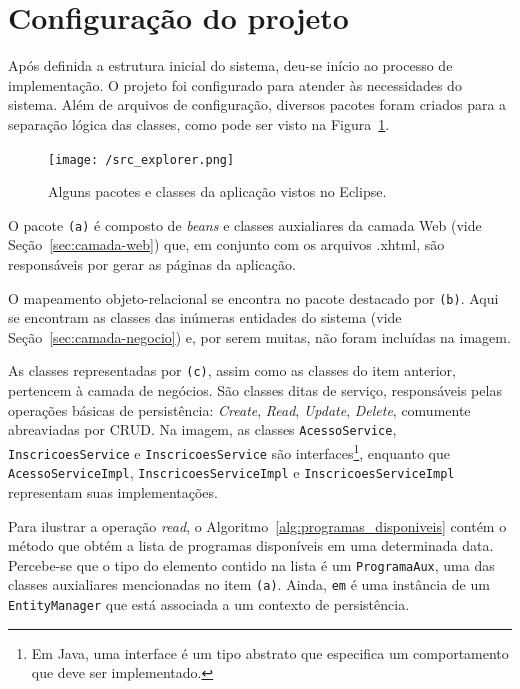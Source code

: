 \documentclass[
  10.5pt,				  %
	openright,			%
	twoside,			  %
  a5paper,
  chapter=TITLE,	%
	section=TITLE,	%
  hyphens,        %
	english,        %
	brazil          %
]{abntex2}
\begin{document}
\section{Configuração do projeto}\label{sec:config}

Após definida a estrutura inicial do sistema, deu-se início ao processo de implementação. O projeto foi configurado para atender às necessidades do sistema. Além de arquivos de configuração, diversos pacotes foram criados para a separação lógica das classes, como pode ser visto na Figura~\ref{fig:src_explorer}.

\begin{figure}[!ht]
  \caption{\label{fig:src_explorer} Alguns pacotes e classes da aplicação vistos no Eclipse. }
  \begin{center}
    \texttt{[image: /src\_explorer.png]}
  \end{center}
\end{figure}

O pacote \texttt{(a)} é composto de \emph{beans} e classes auxialiares da camada Web (vide Seção~\ref{sec:camada-web}) que, em conjunto com os arquivos .xhtml, são responsáveis por gerar as páginas da aplicação.

O mapeamento objeto-relacional se encontra no pacote destacado por \texttt{(b)}. Aqui se encontram as classes das inúmeras entidades do sistema (vide Seção~\ref{sec:camada-negocio}) e, por serem muitas, não foram incluídas na imagem.

As classes representadas por \texttt{(c)}, assim como as classes do item anterior, pertencem à camada de negócios. São classes ditas de serviço, responsáveis pelas operações básicas de persistência: \emph{Create}, \emph{Read}, \emph{Update}, \emph{Delete}, comumente abreaviadas por CRUD. Na imagem, as classes \texttt{AcessoService}, \texttt{InscricoesService} e \texttt{InscricoesService} são interfaces\footnote{Em Java, uma interface é um tipo abstrato que especifica um comportamento que deve ser implementado.}, enquanto que \texttt{AcessoServiceImpl}, \texttt{InscricoesServiceImpl} e \texttt{InscricoesServiceImpl} representam suas implementações.



Para ilustrar a operação \emph{read}, o Algoritmo~\ref{alg:programas_disponiveis} contém o método que obtém a lista de programas disponíveis em uma determinada data. Percebe-se que o tipo do elemento contido na lista é um \texttt{ProgramaAux}, uma das classes auxialiares mencionadas no item \texttt{(a)}. Ainda, \texttt{em} é uma instância de um \texttt{EntityManager} que está associada a um contexto de persistência.
\end{document}
